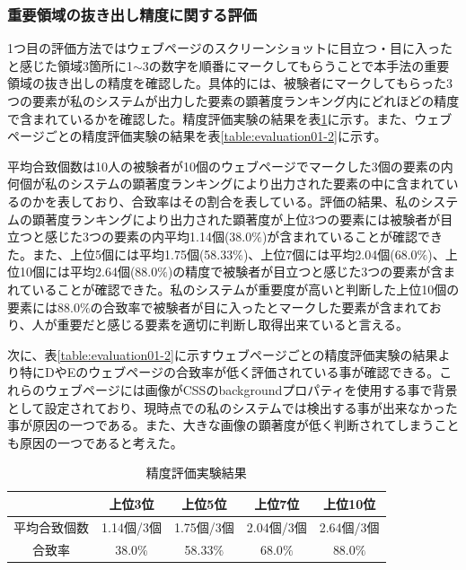\subsubsection{重要領域の抜き出し精度に関する評価}\label{subsec:evaluation1}
\par 1つ目の評価方法ではウェブページのスクリーンショットに目立つ・目に入ったと感じた領域3箇所に1$\sim$3の数字を順番にマークしてもらうことで本手法の重要領域の抜き出しの精度を確認した。具体的には、被験者にマークしてもらった3つの要素が私のシステムが出力した要素の顕著度ランキング内にどれほどの精度で含まれているかを確認した。精度評価実験の結果を表\ref{table:evaluation01-1}に示す。また、ウェブページごとの精度評価実験の結果を表\ref{table:evaluation01-2}に示す。
\par 平均合致個数は10人の被験者が10個のウェブページでマークした3個の要素の内何個が私のシステムの顕著度ランキングにより出力された要素の中に含まれているのかを表しており、合致率はその割合を表している。評価の結果、私のシステムの顕著度ランキングにより出力された顕著度が上位3つの要素には被験者が目立つと感じた3つの要素の内平均1.14個(38.0$\%$)が含まれていることが確認できた。また、上位5個には平均1.75個(58.33$\%$)、上位7個には平均2.04個(68.0$\%$)、上位10個には平均2.64個(88.0$\%$)の精度で被験者が目立つと感じた3つの要素が含まれていることが確認できた。私のシステムが重要度が高いと判断した上位10個の要素には88.0$\%$の合致率で被験者が目に入ったとマークした要素が含まれており、人が重要だと感じる要素を適切に判断し取得出来ていると言える。
\par 次に、表\ref{table:evaluation01-2}に示すウェブページごとの精度評価実験の結果より特にDやEのウェブページの合致率が低く評価されている事が確認できる。これらのウェブページには画像がCSSのbackgroundプロパティを使用する事で背景として設定されており、現時点での私のシステムでは検出する事が出来なかった事が原因の一つである。また、大きな画像の顕著度が低く判断されてしまうことも原因の一つであると考えた。

\begin{table}[H]
    \caption{精度評価実験結果}
    \label{table:evaluation01-1}
    \centering
     \begin{tabular}{c||cccc}
      \hline
      & 上位3位 & 上位5位 & 上位7位 & 上位10位 \\
      \hline \hline
      平均合致個数 & 1.14個/3個 & 1.75個/3個 & 2.04個/3個 & 2.64個/3個 \\
      合致率 & 38.0$\%$ & 58.33$\%$ & $68.0\%$ & $88.0\%$ \\
      \hline
    \end{tabular}
\end{table}

